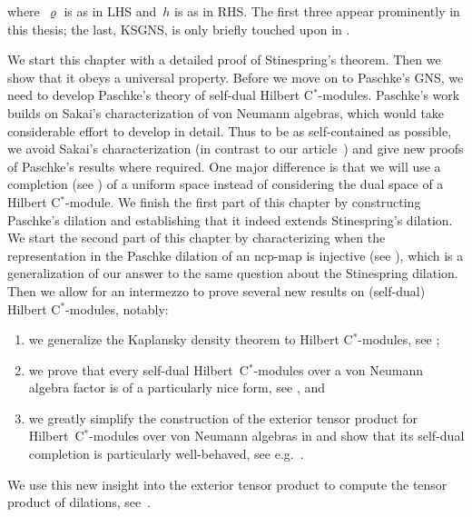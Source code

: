 \documentclass[b]{subfiles}
\begin{document}
\begin{parsec}
\begin{point}
\begin{center}
{        where~$\varrho$ is as in LHS
        and~$h$ is as in RHS.
    The first three appear prominently in this thesis;
        the last, KSGNS, is only briefly touched upon in .}
\end{center}
\begin{point}%
We start this chapter with a detailed proof of Stinespring's theorem.
Then we show that it obeys a universal property.
Before we move on to Paschke's GNS,
    we need to develop Paschke's theory of self-dual Hilbert C$^*$-modules.
Paschke's work builds on Sakai's characterization of von Neumann algebras,
    which would take considerable effort to develop in detail.
Thus to be as self-contained as possible,
    we avoid Sakai's characterization (in contrast to our
        article~\cite{wwpaschke})
    and give new proofs
    of Paschke's results where required.
One major difference is that we will use
    a completion (see ) of a uniform space
    instead of considering the dual space of a Hilbert C$^*$-module.
We finish the first part of this chapter
    by constructing Paschke's dilation
    and establishing that it indeed extends Stinespring's dilation.
We start the second part of this chapter
    by characterizing when the representation in the Paschke dilation
    of an ncp-map is injective (see ),
    which is a generalization of our answer \cite{stineinj}
    to the same question about the Stinespring dilation.
Then we allow for an intermezzo
    to prove several new results on (self-dual) Hilbert C$^*$-modules,
    notably:
\begin{enumerate}
    \item
    we generalize the Kaplansky density theorem
    to Hilbert C$^*$-modules, see ;
    \item
   we prove that every self-dual Hilbert~C$^*$-modules over
            a von Neumann algebra factor
            is of a particularly nice form,
            see , and
    \item
    we greatly simplify the construction of the exterior tensor product
        for Hilbert~C$^*$-modules over von Neumann algebras
        in 
        and show that its self-dual completion
        is particularly well-behaved, see e.g.~.
\end{enumerate}
We use this new insight into the exterior tensor product
    to compute the tensor product
    of dilations, see~.

\end{point}
\end{point}
\end{parsec}
\end{document}
